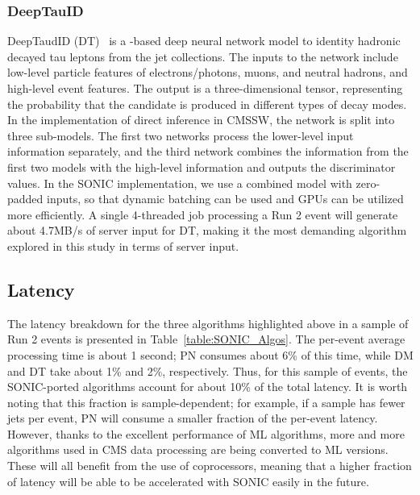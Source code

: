 \subsubsection{DeepTauID}
DeepTaudID (DT)~\cite{CMS:2022prd} is a \TENSORFLOW-based deep neural network model to identity hadronic decayed tau leptons from the jet collections. The inputs to the network include low-level particle features of electrons/photons, muons, and neutral hadrons, and high-level event features. The output is a three-dimensional tensor, representing the probability that the candidate is produced in different types of decay modes. In the implementation of direct inference in CMSSW, the network is split into three sub-models. The first two networks process the lower-level input information separately, and the third network combines the information from the first two models with the high-level information and outputs the discriminator values. In the SONIC implementation, we use a combined model with zero-padded inputs, so that dynamic batching can be used and GPUs can be utilized more efficiently. A single 4-threaded job processing a Run 2 \ttbar event will generate about 4.7\unit{MB/s} of server input for DT, making it the most demanding algorithm explored in this study in terms of server input.
    

\subsection{Latency}

The latency breakdown for the three algorithms highlighted above in a sample of Run 2 \ttbar events is presented in Table~\ref{table:SONIC_Algos}. The per-event average processing time is about 1 second; PN consumes about 6\% of this time, while DM and DT take about 1\% and 2\%, respectively. Thus, for this sample of events, the SONIC-ported algorithms account for about 10\% of the total latency. It is worth noting that this fraction is sample-dependent; for example, if a sample has fewer jets per event, PN will consume a smaller fraction of the per-event latency. However, thanks to the excellent performance of ML algorithms, more and more algorithms used in CMS data processing are being converted to ML versions. These will all benefit from the use of coprocessors, meaning that a higher fraction of latency will be able to be accelerated with SONIC easily in the future.

